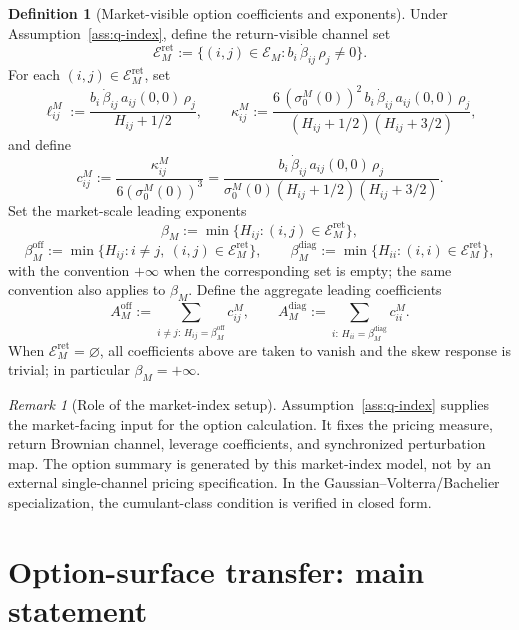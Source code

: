 \documentclass[11pt,a4paper]{amsart}
\theoremstyle{plain}
\theoremstyle{definition}
\newtheorem{definition}[theorem]{Definition}
\theoremstyle{remark}
\newtheorem{remark}[theorem]{Remark}
\newcommand{\cE}{\mathcal{E}}
\begin{document}
\begin{definition}[Market-visible option coefficients and exponents]\label{def:market-option-coeff}
Under Assumption~\ref{ass:q-index}, define the return-visible channel set
\[
        \cE_M^{\mathrm{ret}}
        :=
        \{(i,j)\in\cE_M: b_i\,\dot\beta_{ij}\,\rho_j\neq0\}.
\]
For each \((i,j)\in\cE_M^{\mathrm{ret}}\), set
\[
        \ell_{ij}^M
        :=
        \frac{b_i\,\dot\beta_{ij}\,a_{ij}(0,0)\,\rho_j}{H_{ij}+1/2},
        \qquad
        \kappa_{ij}^M
        :=
        \frac{6\,(\sigma_0^M(0))^2\,b_i\,\dot\beta_{ij}\,a_{ij}(0,0)\,\rho_j}
        {(H_{ij}+1/2)(H_{ij}+3/2)},
\]
and define
\[
        c_{ij}^M
        :=
        \frac{\kappa_{ij}^M}{6(\sigma_0^M(0))^3}
        =
        \frac{b_i\,\dot\beta_{ij}\,a_{ij}(0,0)\,\rho_j}
        {\sigma_0^M(0)(H_{ij}+1/2)(H_{ij}+3/2)}.
\]
Set the market-scale leading exponents
\[
        \beta_M
        :=
        \min\{H_{ij}:(i,j)\in\cE_M^{\mathrm{ret}}\},
\]
\[
        \beta_M^{\mathrm{off}}
        :=
        \min\{H_{ij}:i\neq j,\ (i,j)\in\cE_M^{\mathrm{ret}}\},
        \qquad
        \beta_M^{\mathrm{diag}}
        :=
        \min\{H_{ii}:(i,i)\in\cE_M^{\mathrm{ret}}\},
\]
with the convention \(+\infty\) when the corresponding set is empty; the same convention also
applies to \(\beta_M\).  Define the aggregate
leading coefficients
\[
        A_M^{\mathrm{off}}
        :=
        \sum_{i\neq j:\,H_{ij}=\beta_M^{\mathrm{off}}} c_{ij}^M,
        \qquad
        A_M^{\mathrm{diag}}
        :=
        \sum_{i:\,H_{ii}=\beta_M^{\mathrm{diag}}} c_{ii}^M.
\]
When \(\cE_M^{\mathrm{ret}}=\varnothing\), all coefficients above are taken to vanish and the skew
response is trivial; in particular \(\beta_M=+\infty\).
\end{definition}

\begin{remark}[Role of the market-index setup]
Assumption~\ref{ass:q-index} supplies the market-facing input for the option calculation.  It fixes
the pricing measure, return Brownian channel, leverage coefficients, and synchronized perturbation
map.  The option summary is generated by this market-index model, not by an external single-channel
pricing specification.  In the Gaussian--Volterra/Bachelier specialization, the cumulant-class
condition is verified in closed form.
\end{remark}


\section{Option-surface transfer: main statement}\label{sec:option-transfer-main}
\end{document}
